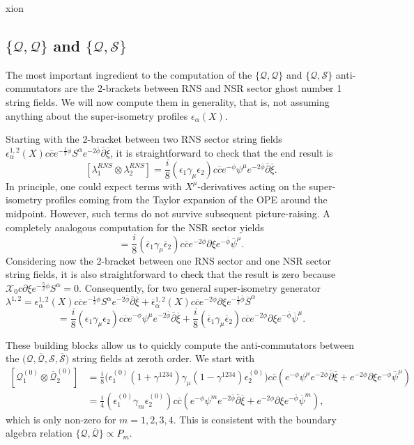 xion\documentclass[12pt]{article}
\def\be{\begin{equation}}
\def\ee{\end{equation}}
\def\ie{\begin{equation}\begin{aligned}}
\def\fe{\end{aligned}\end{equation}}
\numberwithin{equation}{section}
\newcommand{\B}[1]{\overline{#1}}
\begin{document}
\subsection{$\{\mathcal{Q},\mathcal{Q}\}$ and $\{\mathcal{Q},\mathcal{S}\}$}
The most important ingredient to the computation of the $\{\mathcal{Q},\mathcal{Q}\}$ and $\{\mathcal{Q},\mathcal{S}\}$ anti-commutators are the 2-brackets between RNS and NSR sector ghost number 1 string fields. We will now compute them in generality, that is, not assuming anything about the super-isometry profiles $\epsilon_\alpha(X)$.

Starting with the 2-bracket between two RNS sector string fields $\epsilon_{\alpha}^{1,2}(X)c\B{c}e^{-\frac{1}{2}\phi}S^{\alpha}e^{-2\B{\phi}}\B{\partial}\B{\xi}$, it is straightforward to check that the end result is
\be \label{QQcomm}
    [\lambda^{RNS}_1\otimes\lambda^{RNS}_2]=\frac{i}{8}(\epsilon_1\gamma_{\mu}\epsilon_2)c\B{c}e^{-\phi}\psi^{\mu}e^{-2\B{\phi}}\B{\partial}\B{\xi}.
\ee
In principle, one could expect terms with $X^{\mu}$-derivatives acting on the super-isometry profiles coming from the Taylor expansion of the OPE around the midpoint. However, such terms do not survive subsequent picture-raising. A completely analogous computation for the NSR sector yields
\be
    [\lambda_1^{NSR}\otimes\lambda_2^{NSR}]=\frac{i}{8}(\B{\epsilon}_1\gamma_{\mu}\B{\epsilon}_2)c\B{c}e^{-2\phi}\partial\xi e^{-\B{\phi}}\B{\psi}^{\mu}.
\ee
Considering now the 2-bracket between one RNS sector and one NSR sector string fields, it is also straightforward to check that the result is zero because $\mathcal{X}_0c\partial\xi e^{-\frac{5}{2}\phi}S^\alpha=0$. Consequently, for two general super-isometry generator $\lambda^{1,2}=\epsilon^{1,2}_{\alpha}(X)c\B{c}e^{-\frac{1}{2}\phi}S^{\alpha}e^{-2\B{\phi}}\B{\partial}\B{\xi}+\B{\epsilon}^{1,2}_{\alpha}(X)c\B{c}e^{-2\phi}\partial\xi e^{-\frac{1}{2}\B{\phi}}\B{S}^{\alpha}$
\be
    [\lambda^1\otimes\lambda^2]=\frac{i}{8}(\epsilon_1\gamma_{\mu}\epsilon_2)c\B{c}e^{-\phi}\psi^{\mu}e^{-2\B{\phi}}\B{\partial}\B{\xi}+\frac{i}{8}(\B{\epsilon}_1\gamma_{\mu}\B{\epsilon}_2)c\B{c}e^{-2\phi}\partial\xi e^{-\B{\phi}}\B{\psi}^{\mu}.
\ee

These building blocks allow us to quickly compute the anti-commutators between the $\big(\mathcal{Q},\B{\mathcal{Q}},\mathcal{S},\B{\mathcal{S}}\big)$ string fields at zeroth order. We start with
\ie
    [\mathcal{Q}^{(0)}_1\otimes\B{\mathcal{Q}}^{(0)}_2]&=\frac{i}{8}\big(\epsilon^{(0)}_1(1+\gamma^{1234})\gamma_{\mu}(1-\gamma^{1234})\epsilon_2^{(0)}\big)c\B{c}(e^{-\phi}\psi^{\mu}e^{-2\B{\phi}}\B{\partial}\B{\xi}+e^{-2\phi}\partial\xi e^{-\B{\phi}}\B{\psi}^{\mu})\\
    &=\frac{i}{4}(\epsilon_1^{(0)}\gamma_m\epsilon_2^{(0)})c\B{c}(e^{-\phi}\psi^{m}e^{-2\B{\phi}}\B{\partial}\B{\xi}+e^{-2\phi}\partial\xi e^{-\B{\phi}}\B{\psi}^{m}),
\fe
which is only non-zero for $m=1,2,3,4$. This is consistent with the boundary algebra relation $\{\mathcal{Q},\B{\mathcal{Q}}\}\propto P_m$.
\end{document}
